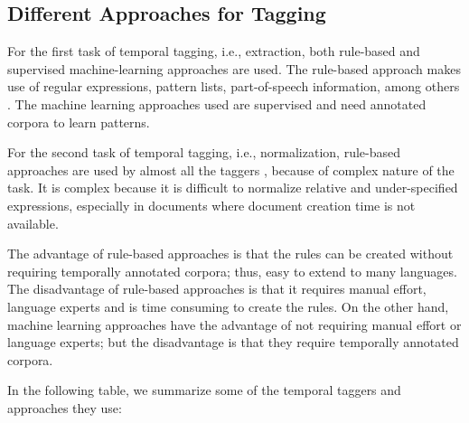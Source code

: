 \subsection{Different Approaches for Tagging}
For the first task of temporal tagging, i.e., extraction, both rule-based and supervised machine-learning approaches are used. The rule-based approach makes use of regular expressions, pattern lists, part-of-speech information, among others \cite{DBLP:phd/de/Strotgen15}. The machine learning approaches used are supervised and need annotated corpora to learn patterns. 

For the second task of temporal tagging, i.e., normalization, rule-based approaches are used by almost all the taggers \cite{DBLP:phd/de/Strotgen15}, because of complex nature of the task. It is complex because it is difficult to normalize relative and under-specified expressions, especially in documents where document creation time is not available. 

The advantage of rule-based approaches is that the rules can be created without requiring temporally annotated corpora; thus, easy to extend to many languages. The disadvantage of rule-based approaches is that it requires manual effort, language experts and is time consuming to create the rules. On the other hand, machine learning approaches have the advantage of not requiring manual effort or language experts; but the disadvantage is that they require temporally annotated corpora. 

In the following table, we summarize some of the temporal taggers and approaches they use:

